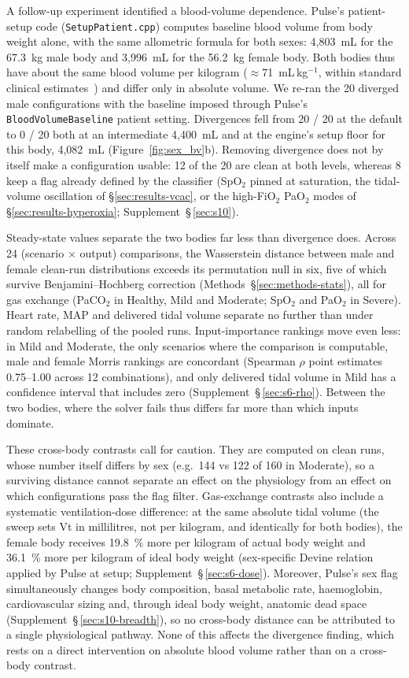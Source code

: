 \documentclass[pdflatex,sn-nature]{sn-jnl}%
\begin{document}
A follow-up experiment identified a blood-volume dependence. Pulse's patient-setup code (\texttt{SetupPatient.cpp}) computes baseline blood volume from body weight alone, with the same allometric formula for both sexes: 4{,}803~mL for the 67.3~kg male body and 3{,}996~mL for the 56.2~kg female body. Both bodies thus have about the same blood volume per kilogram ($\approx$71~mL\,kg$^{-1}$, within standard clinical estimates~\cite{nadler1962}) and differ only in absolute volume. We re-ran the 20 diverged male configurations with the baseline imposed through Pulse's \texttt{BloodVolumeBaseline} patient setting. Divergences fell from 20 / 20 at the default to 0 / 20 both at an intermediate 4{,}400~mL and at the engine's setup floor for this body, 4{,}082~mL (Figure~\ref{fig:sex_bv}b). Removing divergence does not by itself make a configuration usable: 12 of the 20 are clean at both levels, whereas 8 keep a flag already defined by the classifier (SpO$_2$ pinned at saturation, the tidal-volume oscillation of \S\ref{sec:results-vcac}, or the high-FiO$_2$ PaO$_2$ modes of \S\ref{sec:results-hyperoxia}; Supplement~\S\,\ref{sec:s10}).

Steady-state values separate the two bodies far less than divergence does. Across 24 (scenario $\times$ output) comparisons, the Wasserstein distance between male and female clean-run distributions exceeds its permutation null in six, five of which survive Benjamini--Hochberg correction (Methods~\S\ref{sec:methods-stats}), all for gas exchange (PaCO$_2$ in Healthy, Mild and Moderate; SpO$_2$ and PaO$_2$ in Severe). Heart rate, MAP and delivered tidal volume separate no further than under random relabelling of the pooled runs. Input-importance rankings move even less: in Mild and Moderate, the only scenarios where the comparison is computable, male and female Morris rankings are concordant (Spearman $\rho$ point estimates 0.75--1.00 across 12 combinations), and only delivered tidal volume in Mild has a confidence interval that includes zero (Supplement~\S\,\ref{sec:s6-rho}). Between the two bodies, where the solver fails thus differs far more than which inputs dominate.

These cross-body contrasts call for caution. They are computed on clean runs, whose number itself differs by sex (e.g.\ 144 vs 122 of 160 in Moderate), so a surviving distance cannot separate an effect on the physiology from an effect on which configurations pass the flag filter. Gas-exchange contrasts also include a systematic ventilation-dose difference: at the same absolute tidal volume (the sweep sets Vt in millilitres, not per kilogram, and identically for both bodies), the female body receives 19.8~\% more per kilogram of actual body weight and 36.1~\% more per kilogram of ideal body weight (sex-specific Devine relation applied by Pulse at setup; Supplement~\S\,\ref{sec:s6-dose}). Moreover, Pulse's sex flag simultaneously changes body composition, basal metabolic rate, haemoglobin, cardiovascular sizing and, through ideal body weight, anatomic dead space (Supplement~\S\,\ref{sec:s10-breadth}), so no cross-body distance can be attributed to a single physiological pathway. None of this affects the divergence finding, which rests on a direct intervention on absolute blood volume rather than on a cross-body contrast.
\end{document}
